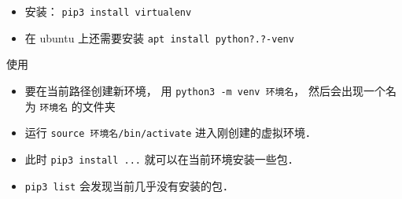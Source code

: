 
\begin{issues}
\issueDraft
\end{issues}

\begin{itemize}
\item 安装： \verb|pip3 install virtualenv|
\item 在 ubuntu 上还需要安装 \verb|apt install python?.?-venv|
\end{itemize}


使用
\begin{itemize}
\item 要在当前路径创建新环境， 用 \verb|python3 -m venv 环境名|， 然后会出现一个名为 \verb|环境名| 的文件夹
\item 运行 \verb|source 环境名/bin/activate| 进入刚创建的虚拟环境．
\item 此时 \verb|pip3 install ...| 就可以在当前环境安装一些包．
\item \verb|pip3 list| 会发现当前几乎没有安装的包．
\end{itemize}

